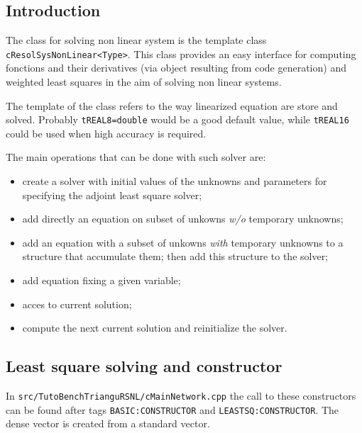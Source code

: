 \subsection{Introduction}

The class for solving  non linear system is the template class 
{\tt  cResolSysNonLinear<Type>}. This class provides an easy interface
for computing fonctions and their derivatives (via object resulting from code generation)
and weighted least squares in the aim of solving non linear systems.

The template of the class refers to the way linearized equation are store and solved.
Probably {\tt tREAL8=double}  would be a good default value, while {\tt tREAL16}
could be used when high accuracy is required.

The main operations that can be done with such solver are:

\UNCLEAR
\begin{itemize}
   \item create a solver with initial values of the unknowns and parameters for
          specifying the adjoint least square solver; 

   \item add directly  an equation on subset of unkowns \emph{w/o} temporary unknowns;

   \item add  an equation with a subset of unkowns \emph{with} temporary unknowns  to
         a structure that accumulate them;  then  add this structure to the solver;

   \item add equation fixing a given variable;

   \item acces to current solution;

   \item compute the next current solution and reinitialize the solver.

\end{itemize}



\subsection{Least square solving and constructor}

In {\tt src/TutoBenchTrianguRSNL/cMainNetwork.cpp} the call to these constructors can be found
after tags {\tt  BASIC:CONSTRUCTOR} and {\tt LEASTSQ:CONSTRUCTOR}.
The dense vector is created from a standard vector.\UNCLEAR

